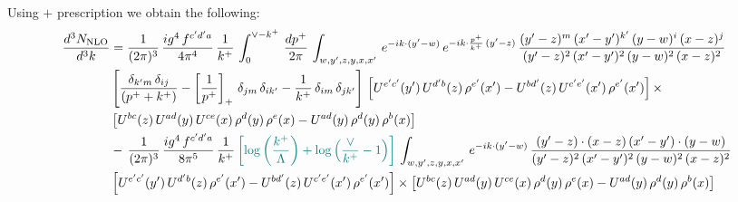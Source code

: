 \documentclass[9pt]{article}
\numberwithin{equation}{section}
\begin{document}
Using $+$ prescription we obtain the following:
\begin{align}
    \frac{d^{3}N_{\rm NLO}}{d^{3}k} & = \frac{1}{(2\pi)^{3}}\, \frac{ig^{4}\,f^{c'd'a}}{4\pi^{4}}\, \frac{1}{k^{+}}\,\int_{0}^{\vee-k^{+}}\, \frac{dp^{+}}{2\pi}\, \int_{w,y',z,y,x,x'}\, e^{-ik\cdot (y'-w)}\, e^{-ik\cdot \frac{p^{+}}{k^{+}}\,(y'-z)}\,\frac{(y'-z)^{m}\,(x'-y')^{k'}\,(y-w)^{i}\,(x-z)^{j}}{(y'-z)^{2}\,(x'-y')^{2}\,(y-w)^{2}\,(x-z)^{2}}\notag \\ & \left[\frac{\delta_{k'm}\,\delta_{ij}}{(p^{+}+k^{+})}-\left[\frac{1}{p^{+}}\right]_{+}\,\delta_{jm}\,\delta_{ik'}-\frac{1}{k^{+}}\, \delta_{im}\, \delta_{jk'}\right]\, \left[U^{e'c'}(y')\,U^{d'b}(z)\,\rho^{e'}(x')-U^{bd'}(z)\,U^{c'e'}(x')\,\rho^{e'}(x')\right]\times\notag \\ &  \left[U^{bc}(z)\,U^{ad}(y)\,U^{ce}(x)\,\rho^{d}(y)\,\rho^{e}(x)-U^{ad}(y)\,\rho^{d}(y)\,\rho^{b}(x)\right]\notag \\ &  -\,\frac{1}{(2\pi)^{3}}\, \frac{ig^{4}\,f^{c'd'a}}{8\pi^{5}}\, \frac{1}{k^{+}}\,{\color{teal}\left[\log{\left(\frac{k^{+}}{\Lambda}\right)}+\log{\left(\frac{\vee}{k^{+}}-1\right)}\right]}\, \int_{w,y',z,y,x,x'}\, e^{-ik\cdot (y'-w)}\,\frac{(y'-z)\cdot (x-z)\,(x'-y')\cdot (y-w)}{(y'-z)^{2}\,(x'-y')^{2}\,(y-w)^{2}\,(x-z)^{2}}\notag \\ & \left[U^{e'c'}(y')\,U^{d'b}(z)\,\rho^{e'}(x')-U^{bd'}(z)\,U^{c'e'}(x')\,\rho^{e'}(x')\right]\times  \left[U^{bc}(z)\,U^{ad}(y)\,U^{ce}(x)\,\rho^{d}(y)\,\rho^{e}(x)-U^{ad}(y)\,\rho^{d}(y)\,\rho^{b}(x)\right]
\end{align}
\end{document}
